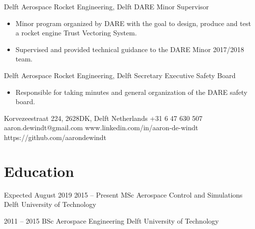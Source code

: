 \documentclass{tccv}
\begin{document}
\begin{eventlist}
     {Delft Aerospace Rocket Engineering, Delft}
     {DARE Minor Supervisor}
\begin{itemize}
    \item Minor program organized by DARE with the goal to design, produce and test a rocket engine Trust Vectoring System.
    \item Supervised and provided technical guidance to the DARE Minor 2017/2018 team.
\end{itemize}

     {Delft Aerospace Rocket Engineering, Delft}
     {Secretary Executive Safety Board}
\begin{itemize}
    \item Responsible for taking minutes and general organization of the DARE safety board.
\end{itemize}


\end{eventlist}

\personal
    {Korvezeestraat 224, 2628DK, Delft \newline Netherlands }
    {+31 6 47 630 507}
    {aaron.dewindt@gmail.com}
    {www.linkedin.com/in/aaron-de-windt}
    {https://github.com/aarondewindt}

\section{Education}

\begin{yearlist}

\item[Expected August 2019]{2015 -- Present}
    {MSc Aerospace Control and Simulations}
    {Delft University of Technology}

\item{2011 -- 2015}
    {BSc Aerospace Engineering}
    {Delft University of Technology}

\end{yearlist}



\end{document}
